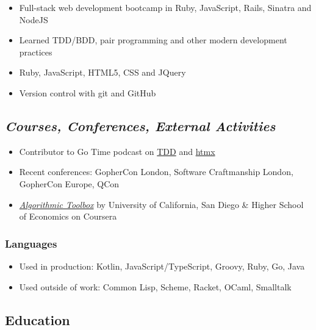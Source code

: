 \begin{itemize}
\tightlist
\item
  Full-stack web development bootcamp in Ruby, JavaScript, Rails,
  Sinatra and NodeJS
\item
  Learned TDD/BDD, pair programming and other modern development
  practices
\item
  Ruby, JavaScript, HTML5, CSS and JQuery
\item
  Version control with git and GitHub
\end{itemize}

\hypertarget{courses-conferences-external-activities}{%
\subsection{\texorpdfstring{\emph{Courses, Conferences, External
Activities}}{Courses, Conferences, External Activities}}\label{courses-conferences-external-activities}}

\begin{itemize}
\tightlist
\item
  Contributor to Go Time podcast on
  \href{https://changelog.com/gotime/185}{TDD} and
  \href{https://changelog.com/gotime/266}{htmx}
\item
  Recent conferences: GopherCon London, Software Craftmanship London,
  GopherCon Europe, QCon
\item
  \href{https://www.coursera.org/account/accomplishments/records/C58NGM7GQS84}{\emph{Algorithmic
  Toolbox}} by University of California, San Diego \& Higher School of
  Economics on Coursera
\end{itemize}

\hypertarget{languages}{%
\subsubsection{Languages}\label{languages}}

\begin{itemize}
\tightlist
\item
  Used in production: Kotlin, JavaScript/TypeScript, Groovy, Ruby, Go,
  Java
\item
  Used outside of work: Common Lisp, Scheme, Racket, OCaml, Smalltalk
\end{itemize}

\hypertarget{education}{%
\subsection{Education}\label{education}}

